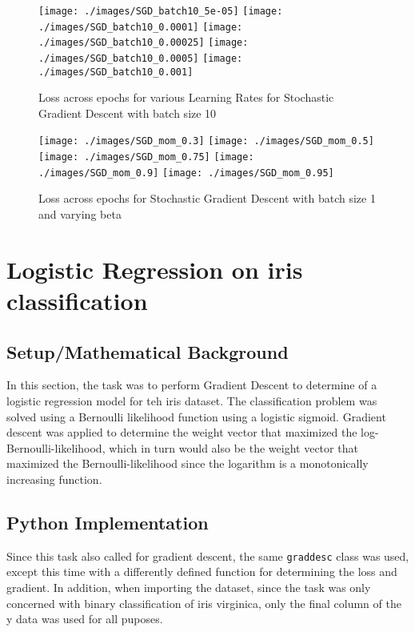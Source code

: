 \documentclass{article}
\begin{document}
\begin{figure}
\centering
\texttt{[image: ./images/SGD\_batch10\_5e-05]}
\texttt{[image: ./images/SGD\_batch10\_0.0001]}
\texttt{[image: ./images/SGD\_batch10\_0.00025]}
\texttt{[image: ./images/SGD\_batch10\_0.0005]}
\texttt{[image: ./images/SGD\_batch10\_0.001]}
\caption{Loss across epochs for various Learning Rates for Stochastic Gradient Descent with batch size 10}
\end{figure}

\begin{figure}
\centering
\texttt{[image: ./images/SGD\_mom\_0.3]}
\texttt{[image: ./images/SGD\_mom\_0.5]}
\texttt{[image: ./images/SGD\_mom\_0.75]}
\texttt{[image: ./images/SGD\_mom\_0.9]}
\texttt{[image: ./images/SGD\_mom\_0.95]}
\caption{Loss across epochs for Stochastic Gradient Descent with batch size 1 and varying beta}
\end{figure}


\section{Logistic Regression on iris classification}

\subsection{Setup/Mathematical Background}
In this section, the task was to perform Gradient Descent to determine of a logistic regression model for teh iris dataset. The classification problem was solved using a Bernoulli likelihood function using a logistic sigmoid. Gradient descent was applied to determine the weight vector that maximized the log-Bernoulli-likelihood, which in turn would also be the weight vector that maximized the Bernoulli-likelihood since the logarithm is a monotonically increasing function.

\subsection{Python Implementation}
Since this task also called for gradient descent, the same \verb+graddesc+ class was used, except this time with a differently defined function for determining the loss and gradient. In addition, when importing the dataset, since the task was only concerned with binary classification of iris virginica, only the final column of the y data was used for all puposes.
\end{document}

